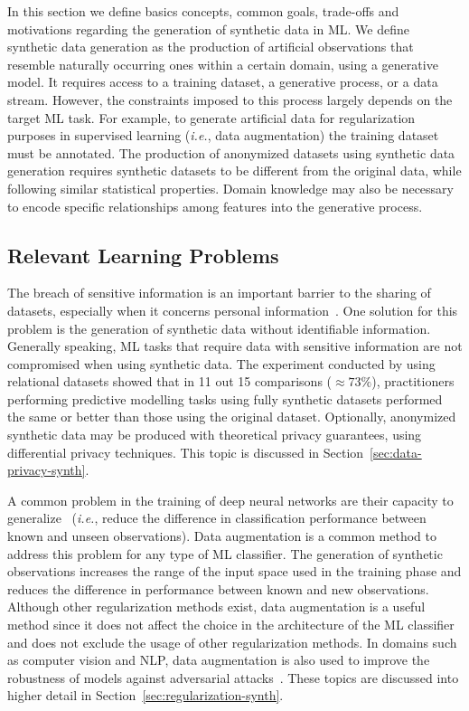 In this section we define basics concepts, common goals, trade-offs and
motivations regarding the generation of synthetic data in ML\@. We define
synthetic data generation as the production of artificial observations that
resemble naturally occurring ones within a certain domain, using a generative
model. It requires access to a training dataset, a generative process, or a
data stream. However, the constraints imposed to this process largely depends
on the target ML task. For example, to generate artificial data for
regularization purposes in supervised learning (\textit{i.e.}, data
augmentation) the training dataset must be annotated. The production of
anonymized datasets using synthetic data generation requires synthetic
datasets to be different from the original data, while following similar
statistical properties. Domain knowledge may also be necessary to encode
specific relationships among features into the generative process.


\subsection{Relevant Learning Problems}

The breach of sensitive information is an important barrier to the sharing of
datasets, especially when it concerns personal
information~\cite{dankar2021fake}. One solution for this problem is the
generation of synthetic data without identifiable information. Generally
speaking, ML tasks that require data with sensitive information are not
compromised when using synthetic data. The experiment conducted by
\citet{patki2016synthetic} using relational datasets showed that in 11 out 15
comparisons ($\approx 73\%$), practitioners performing predictive modelling
tasks using fully synthetic datasets performed the same or better than those
using the original dataset. Optionally, anonymized synthetic data may be
produced with theoretical privacy guarantees, using differential privacy
techniques. This topic is discussed in Section~\ref{sec:data-privacy-synth}.

A common problem in the training of deep neural networks are their capacity to
generalize~\cite{Zhang2021} (\textit{i.e.}, reduce the difference in
classification performance between known and unseen observations). Data
augmentation is a common method to address this problem for any type of ML
classifier. The generation of synthetic observations increases the range of
the input space used in the training phase and reduces the difference in
performance between known and new observations. Although other regularization
methods exist, data augmentation is a useful method since it does not affect
the choice in the architecture of the ML classifier and does not exclude the
usage of other regularization methods. In domains such as computer vision and
NLP, data augmentation is also used to improve the robustness of models
against adversarial attacks~\cite{zeng2020data, morris2020textattack}. These
topics are discussed into higher detail in Section~\ref{sec:regularization-synth}.


